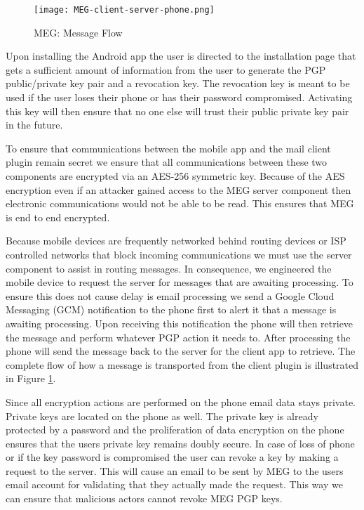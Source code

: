 \documentclass[10pt]{article}
\begin{document}
\begin{figure}[h]
    \texttt{[image: MEG-client-server-phone.png]}
    \caption{MEG: Message Flow}
    \label{fig:Flow}
\end{figure}
\begin{multicols}{2}
\par Upon installing the Android app the user is directed to the installation page that gets a sufficient amount of information from the user to generate the PGP public/private key pair and a revocation key. The revocation key is meant to be used if the user loses their phone or has their password compromised. Activating this key will then ensure that no one else will trust their public private key pair in the future.
\par To ensure that communications between the mobile app and the mail client plugin remain secret we ensure that all communications between these two components are encrypted via an AES-256 symmetric key. Because of the AES encryption even if an attacker gained access to the MEG server component then electronic communications would not be able to be read. This ensures that MEG is end to end encrypted.
\par Because mobile devices are frequently networked behind routing devices or ISP controlled networks that block incoming communications we must use the server component to assist in routing messages. In consequence, we engineered the mobile device to request the server for messages that are awaiting processing. To ensure this does not cause delay is email processing we send a Google Cloud Messaging (GCM) notification to the phone first to alert it that a message is awaiting processing. Upon receiving this notification the phone will then retrieve the message and perform whatever PGP action it needs to. After processing the phone will send the message back to the server for the client app to retrieve. The complete flow of how a message is transported from the client plugin is illustrated in Figure \ref{fig:Flow}.
\par Since all encryption actions are performed on the phone email data stays private. Private keys are located on the phone as well. The private key is already protected by a password and the proliferation of data encryption on the phone ensures that the users private key remains doubly secure. In case of loss of phone or if the key password is compromised the user can revoke a key by making a request to the server. This will cause an email to be sent by MEG to the users email account for validating that they actually made the request. This way we can ensure that malicious actors cannot revoke MEG PGP keys.

\end{multicols}
\end{document}
